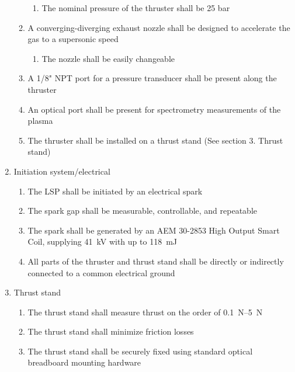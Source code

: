 \begin{enumerate}
\begin{enumerate}
                    \begin{enumerate}
                        \item The nominal pressure of the thruster shall be 25 bar
                    \end{enumerate}
                    \item A converging-diverging exhaust nozzle shall be designed to accelerate the gas to a supersonic speed
                    \begin{enumerate}
                        \item The nozzle shall be easily changeable
                    \end{enumerate}
                    \item A 1/8" NPT port for a pressure transducer shall be present along the thruster
                    \item An optical port shall be present for spectrometry measurements of the plasma
                    \item The thruster shall be installed on a thrust stand (See section 3. Thrust stand)
                \end{enumerate}
                \item Initiation system/electrical
                \begin{enumerate}
                    \item The LSP shall be initiated by an electrical spark
                    \item The spark gap shall be measurable, controllable, and repeatable
                    \item The spark shall be generated by an AEM 30-2853 High Output Smart Coil, supplying \qty{41}{kV} with up to \qty{118}{mJ}
                    \item All parts of the thruster and thrust stand shall be directly or indirectly connected to a common electrical ground
                \end{enumerate}
                \item Thrust stand
                \begin{enumerate}
                    \item The thrust stand shall measure thrust on the order of \qtyrange{0.1}{5}{N}
                    \item The thrust stand shall minimize friction losses
                    \item The thrust stand shall be securely fixed using standard optical breadboard mounting hardware
                \end{enumerate}
            \end{enumerate}

